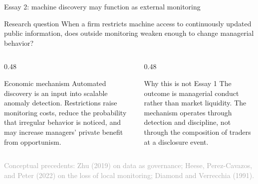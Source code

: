 \documentclass[aspectratio=169,10pt]{beamer}
\newcommand{\source}[1]{\vfill{\scriptsize\textcolor{DarkGray}{#1}}}
\begin{document}
\begin{frame}[t]{Essay 2: machine discovery may function as external monitoring}
\begin{block}{Research question}
\large
When a firm restricts machine access to continuously updated public information, does outside monitoring weaken enough to change managerial behavior?
\end{block}

\small
\begin{columns}[T,onlytextwidth]
  \begin{column}{0.48\textwidth}
    \begin{block}{Economic mechanism}
      Automated discovery is an input into scalable anomaly detection. Restrictions raise monitoring costs, reduce the probability that irregular behavior is noticed, and may increase managers' private benefit from opportunism.
    \end{block}
  \end{column}
  \begin{column}{0.48\textwidth}
    \begin{block}{Why this is not Essay 1}
      The outcome is managerial conduct rather than market liquidity. The mechanism operates through detection and discipline, not through the composition of traders at a disclosure event.
    \end{block}
  \end{column}
\end{columns}

\source{Conceptual precedents: Zhu (2019) on data as governance; Heese, Perez-Cavazos, and Peter (2022) on the loss of local monitoring; Diamond and Verrecchia (1991).}
\end{frame}
\end{document}
